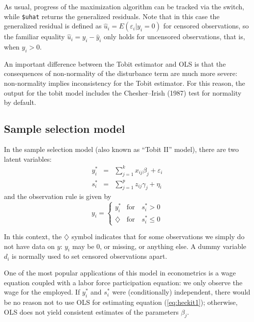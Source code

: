 As usual, progress of the maximization algorithm can be tracked via
the  switch, while \verb+$uhat+ returns the
generalized residuals. Note that in this case the generalized residual
is defined as $\hat{u}_i = E(\varepsilon_i | y_i = 0)$ for censored
observations, so the familiar equality $\hat{u}_i = y_i - \hat{y}_i$
only holds for uncensored observations, that is, when $y_i>0$.

An important difference between the Tobit estimator and OLS is that
the consequences of non-normality of the disturbance term are much
more severe: non-normality implies inconsistency for the Tobit
estimator. For this reason, the output for the tobit model includes
the Chesher--Irish (1987) test for normality by default.

\subsection{Sample selection model}
\label{sec:heckit}

In the sample selection model (also known as ``Tobit II'' model),
there are two latent variables:
%
\begin{eqnarray}
  \label{eq:heckit1}
  y^*_i & = & \sum_{j=1}^k x_{ij} \beta_j + \varepsilon_i \\
  \label{eq:heckit2}
  s^*_i & = & \sum_{j=1}^p z_{ij} \gamma_j + \eta_i 
\end{eqnarray}
%
and the observation rule is given by
%
\begin{equation}
  \label{eq:tobitII}
  y_i = \left\{ 
    \begin{array}{ll} 
      y^*_i & \mathrm{for} \quad s^*_i > 0 \\ 
      \diamondsuit & \mathrm{for} \quad s^*_i \le 0 
    \end{array}
    \right. 
\end{equation}

In this context, the $\diamondsuit$ symbol indicates that for some
observations we simply do not have data on $y$: $y_i$ may be 0, or
missing, or anything else. A dummy variable $d_i$ is normally used to
set censored observations apart.

One of the most popular applications of this model in econometrics is
a wage equation coupled with a labor force participation equation: we
only observe the wage for the employed. If $y^*_i$ and $s^*_i$ were
(conditionally) independent, there would be no reason not to use OLS
for estimating equation (\ref{eq:heckit1}); otherwise, OLS does not
yield consistent estimates of the parameters $\beta_j$.

